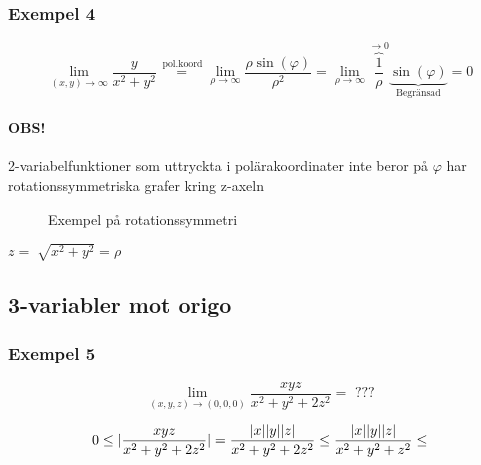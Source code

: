 \documentclass[a4paper]{article}
\DeclarePairedDelimiter \abs{\lvert}{\rvert}
\let\oldsqrt\sqrt
\renewcommand*{\sqrt}[2][\ ]{\oldsqrt[#1]{#2} }
\begin{document}
\newpage
\subsubsection{Exempel 4}

\begin{equation} \label{eq:2.4}
	\lim_{(x,y) \rightarrow \infty} \frac{y}{x^2+y^2} \overset{\,\mathrm{pol.koord}}{=} \lim_{\rho \rightarrow \infty} \frac{\rho \sin(\varphi)}{\rho^2} =
	\lim_{\rho \rightarrow \infty} \overbrace{\frac{1}{\rho}}^{\rightarrow 0} \underbrace{\sin(\varphi)}_\text{Begränsad} = 0
\end{equation}

\paragraph{OBS!} 2-variabelfunktioner som uttryckta i polärakoordinater inte beror på $\varphi$ har rotationssymmetriska grafer kring z-axeln

\begin{figure}[ht]
\usetikzlibrary{3d}
\caption{Exempel på rotationssymmetri} \label{fig:2.3}
\end{figure}

\(
z = \sqrt{x^2+y^2} = \rho
\)

\subsection{3-variabler mot origo}
\subsubsection{Exempel 5}

\begin{equation} \label{eq:2.5}
	\lim_{(x,y,z) \rightarrow (0,0,0)} \frac{xyz}{x^2+y^2+2z^2} = \text{ ???}
\end{equation}

\[
	0 \leq \abs{\frac{xyz}{x^2+y^2+2z^2}} = \frac{\abs{x}\abs{y}\abs{z}}{x^2+y^2+2z^2} \leq \frac{\abs{x}\abs{y}\abs{z}}{x^2+y^2+z^2} \leq
\]
\end{document}
